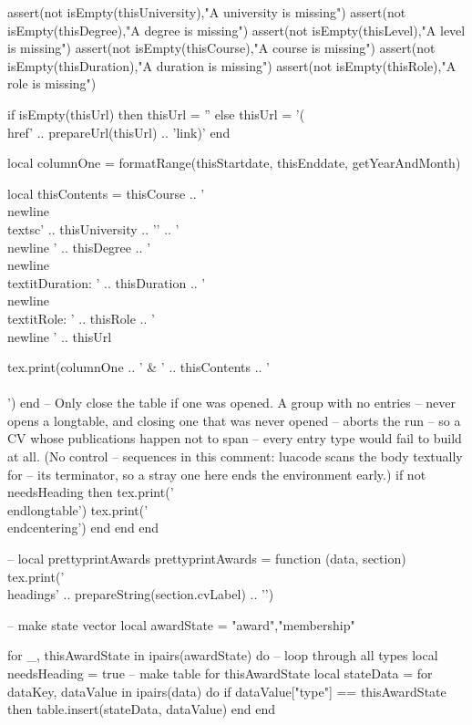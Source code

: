 \documentclass[letterpaper, 10pt]{article}
\newcommand{\headings}[1]{\section*{#1} \hrule \vspace{10pt}}
\begin{document}
\begin{luacode}
				assert(not isEmpty(thisUniversity),"A university is missing")
				assert(not isEmpty(thisDegree),"A degree is missing")
				assert(not isEmpty(thisLevel),"A level is missing")
				assert(not isEmpty(thisCourse),"A course is missing")
				assert(not isEmpty(thisDuration),"A duration is missing")
				assert(not isEmpty(thisRole),"A role is missing")

				if isEmpty(thisUrl) then
					thisUrl = ''
				else
					thisUrl = '(\\href{' .. prepareUrl(thisUrl) .. '}{link})'
				end

				local columnOne = formatRange(thisStartdate, thisEnddate, getYearAndMonth)

				local thisContents = thisCourse ..
									'\\newline\\textsc{' .. thisUniversity .. '}' ..
									'\\newline ' .. thisDegree ..
									'\\newline\\textit{Duration:} ' .. thisDuration ..
									'\\newline\\textit{Role:} ' .. thisRole ..
									'\\newline ' .. thisUrl

				tex.print(columnOne .. ' & ' .. thisContents .. ' \\\\')
			end
			-- Only close the table if one was opened. A group with no entries
			-- never opens a longtable, and closing one that was never opened
			-- aborts the run -- so a CV whose publications happen not to span
			-- every entry type would fail to build at all. (No control
			-- sequences in this comment: luacode scans the body textually for
			-- its terminator, so a stray one here ends the environment early.)
			if not needsHeading then
				tex.print('\\end{longtable}')
				tex.print('\\end{centering}')
			end
		end
	end

	-- local prettyprintAwards
	prettyprintAwards = function (data, section)
		tex.print('\\headings{' .. prepareString(section.cvLabel) .. '}')

		-- make state vector
		local awardState = {"award","membership"}

		for _, thisAwardState in ipairs(awardState) do 											-- loop through all types
			local needsHeading = true
			-- make table for thisAwardState
			local stateData = {}
			for dataKey, dataValue in ipairs(data) do
				if dataValue["type"] == thisAwardState then
					table.insert(stateData, dataValue)
				end
			end


\end{luacode}
\end{document}
